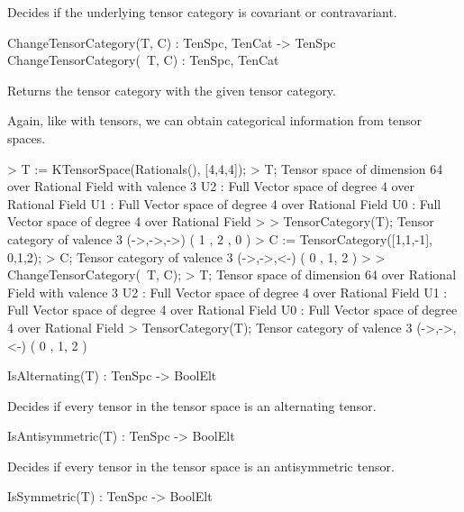 Decides if the underlying tensor category is covariant or contravariant.

\begin{intrinsics}
ChangeTensorCategory(T, C) : TenSpc, TenCat -> TenSpc
ChangeTensorCategory(~T, C) : TenSpc, TenCat
\end{intrinsics}

Returns the tensor category with the given tensor category.

\begin{example}[TenSpcCategories]

Again, like with tensors, we can obtain categorical information from tensor spaces.
\begin{code}
> T := KTensorSpace(Rationals(), [4,4,4]);
> T;
Tensor space of dimension 64 over Rational Field with valence 3
U2 : Full Vector space of degree 4 over Rational Field
U1 : Full Vector space of degree 4 over Rational Field
U0 : Full Vector space of degree 4 over Rational Field
> 
> TensorCategory(T);
Tensor category of valence 3 (->,->,->) ({ 1 },{ 2 },{ 0 })
> C := TensorCategory([1,1,-1], {{0},{1,2}});
> C;
Tensor category of valence 3 (->,->,<-) ({ 0 },{ 1, 2 })
> 
> ChangeTensorCategory(~T, C);
> T;
Tensor space of dimension 64 over Rational Field with valence 3
U2 : Full Vector space of degree 4 over Rational Field
U1 : Full Vector space of degree 4 over Rational Field
U0 : Full Vector space of degree 4 over Rational Field
> TensorCategory(T);
Tensor category of valence 3 (->,->,<-) ({ 0 },{ 1, 2 })
\end{code}
\end{example}


\begin{intrinsics}
IsAlternating(T) : TenSpc -> BoolElt
\end{intrinsics}

Decides if every tensor in the tensor space is an alternating tensor.

\begin{intrinsics}
IsAntisymmetric(T) : TenSpc -> BoolElt
\end{intrinsics}

Decides if every tensor in the tensor space is an antisymmetric tensor.

\begin{intrinsics}
IsSymmetric(T) : TenSpc -> BoolElt
\end{intrinsics}

